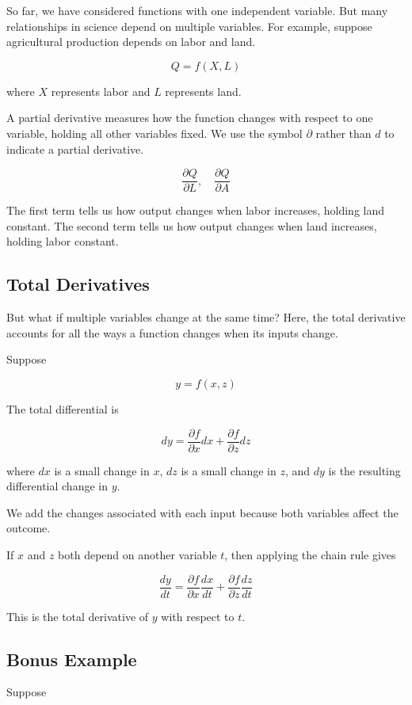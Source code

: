 \documentclass[12pt]{article}
\begin{document}
So far, we have considered functions with one independent variable. But many relationships in science depend on multiple variables. For example, suppose agricultural production depends on labor and land.

\[
Q=f(X,L)
\]

where $X$ represents labor and $L$ represents land.

A partial derivative measures how the function changes with respect to one variable, holding all other variables fixed. We use the symbol $\partial$ rather than $d$
to indicate a partial derivative.

\[
\frac{\partial Q}{\partial L}, \quad \frac{\partial Q}{\partial A}
\]

The first term tells us how output changes when labor increases, holding land constant. The second term tells us how output changes when land increases, holding labor constant.


\subsection{Total Derivatives}

But what if multiple variables change at the same time? Here, the total derivative accounts for all the ways a function changes when its inputs change.

Suppose

\[
y=f(x,z)
\]

The total differential is

\[
dy=
\frac{\partial f}{\partial x}dx
+
\frac{\partial f}{\partial z}dz
\]

where $dx$ is a small change in $x$, $dz$ is a small change in $z$, and $dy$ is the resulting differential change in $y$.

We add the changes associated with each input
because both variables affect the outcome.

If $x$ and $z$ both depend on another variable
$t$, then applying the chain rule gives

\[
\frac{dy}{dt}
=
\frac{\partial f}{\partial x}
\frac{dx}{dt}
+
\frac{\partial f}{\partial z}
\frac{dz}{dt}
\]

This is the total derivative of $y$ with
respect to $t$.

\subsection{Bonus Example}

Suppose
\end{document}
